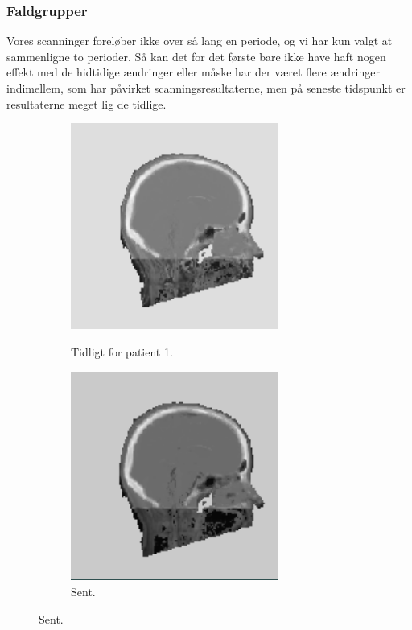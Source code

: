 \subsubsection{Faldgrupper}

Vores scanninger foreløber ikke over så lang en periode, og vi har
kun valgt at sammenligne to perioder. Så kan det for det første
bare ikke have haft nogen effekt med de hidtidige ændringer eller
måske har der været flere ændringer indimellem, som har påvirket
scanningsresultaterne, men på seneste tidspunkt er resultaterne meget
lig de tidlige.

\begin{figure}
    \centering
    \begin{subfigure}[b]{0.3\textwidth}
        \caption{Tidligt for patient 1.}
        \includegraphics[width=0.75\textwidth]{colager/over_tid_sct/over_tid_sct_121280_early.png}
        \label{col:over_time_sct_pat1_early}
    \end{subfigure}\hfill
    \begin{subfigure}[b]{0.3\textwidth}
        \caption{Sent.}
        \includegraphics[width=0.75\textwidth]{colager/over_tid_sct/over_tid_sct_121280_late.png}

\end{subfigure}
\end{figure}

